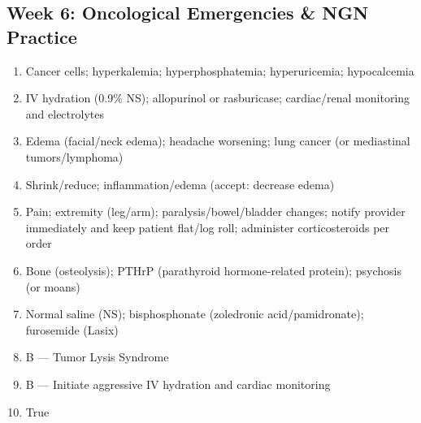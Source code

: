 \documentclass[11pt,letterpaper]{article}
\begin{document}
\begin{keybox}
\subsection*{Week 6: Oncological Emergencies \& NGN Practice}
\begin{enumerate}[leftmargin=1.5em,label=\textbf{\arabic*.},start=11]
  \item Cancer cells; hyperkalemia; hyperphosphatemia; hyperuricemia; hypocalcemia
  \item IV hydration (0.9\% NS); allopurinol or rasburicase; cardiac/renal monitoring and electrolytes
  \item Edema (facial/neck edema); headache worsening; lung cancer (or mediastinal tumors/lymphoma)
  \item Shrink/reduce; inflammation/edema (accept: decrease edema)
  \item Pain; extremity (leg/arm); paralysis/bowel/bladder changes; notify provider immediately and keep patient flat/log roll; administer corticosteroids per order
  \item Bone (osteolysis); PTHrP (parathyroid hormone-related protein); psychosis (or moans)
  \item Normal saline (NS); bisphosphonate (zoledronic acid/pamidronate); furosemide (Lasix)
  \item B --- Tumor Lysis Syndrome
  \item B --- Initiate aggressive IV hydration and cardiac monitoring
  \item True
\end{enumerate}

\hrulefill

\end{keybox}
\end{document}
